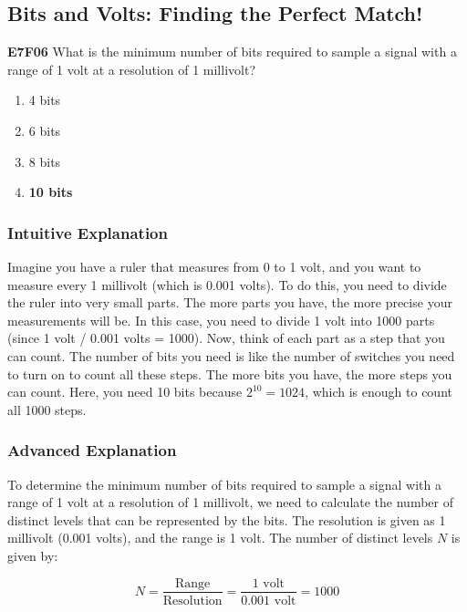 \subsection{Bits and Volts: Finding the Perfect Match!}
\label{sec:E7F06}

\begin{tcolorbox}[colback=blue!5!white,colframe=blue!75!black,title=E7F06]
\textbf{E7F06} What is the minimum number of bits required to sample a signal with a range of 1 volt at a resolution of 1 millivolt?
\begin{enumerate}[label=\Alph*,noitemsep]
    \item 4 bits
    \item 6 bits
    \item 8 bits
    \item \textbf{10 bits}
\end{enumerate}
\end{tcolorbox}

\subsubsection{Intuitive Explanation}
Imagine you have a ruler that measures from 0 to 1 volt, and you want to measure every 1 millivolt (which is 0.001 volts). To do this, you need to divide the ruler into very small parts. The more parts you have, the more precise your measurements will be. In this case, you need to divide 1 volt into 1000 parts (since 1 volt / 0.001 volts = 1000). Now, think of each part as a step that you can count. The number of bits you need is like the number of switches you need to turn on to count all these steps. The more bits you have, the more steps you can count. Here, you need 10 bits because \(2^{10} = 1024\), which is enough to count all 1000 steps.

\subsubsection{Advanced Explanation}
To determine the minimum number of bits required to sample a signal with a range of 1 volt at a resolution of 1 millivolt, we need to calculate the number of distinct levels that can be represented by the bits. The resolution is given as 1 millivolt (0.001 volts), and the range is 1 volt. The number of distinct levels \(N\) is given by:

\[
N = \frac{\text{Range}}{\text{Resolution}} = \frac{1 \text{ volt}}{0.001 \text{ volt}} = 1000
\]

